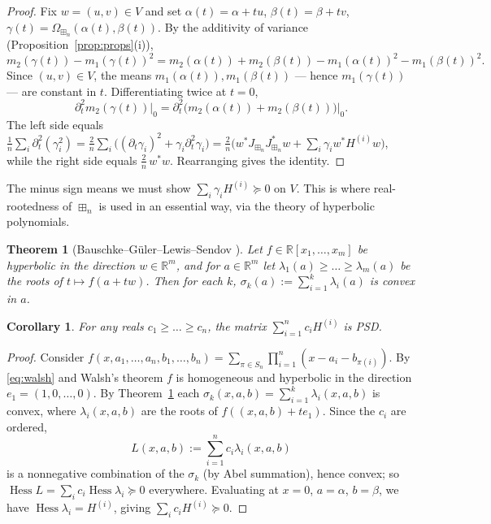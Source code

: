 \documentclass[11pt]{article}
\newcommand{\R}{\mathbb{R}}
\newcommand{\bn}{\boxplus_n}
\newcommand{\Hess}{\operatorname{Hess}}
\newcommand{\PSD}{\succeq 0}
\newtheorem{theorem}{Theorem}
\newtheorem{corollary}{Corollary}
\theoremstyle{definition}
\begin{document}
\begin{proof}
Fix $w=(u,v)\in V$ and set $\alpha(t)=\alpha+tu$, $\beta(t)=\beta+tv$,
$\gamma(t)=\Omega_{\bn}(\alpha(t),\beta(t))$. By the additivity of variance
(Proposition~\ref{prop:props}(i)),
\[
m_2(\gamma(t))-m_1(\gamma(t))^2
=m_2(\alpha(t))+m_2(\beta(t))-m_1(\alpha(t))^2-m_1(\beta(t))^2 .
\]
Since $(u,v)\in V$, the means $m_1(\alpha(t)),m_1(\beta(t))$ — hence
$m_1(\gamma(t))$ — are constant in $t$. Differentiating twice at $t=0$,
\[
\partial_t^2 m_2(\gamma(t))\big|_0=\partial_t^2\bigl(m_2(\alpha(t))+m_2(\beta(t))\bigr)\big|_0 .
\]
The left side equals
$\tfrac1n\sum_i\partial_t^2(\gamma_i^2)
=\tfrac2n\sum_i\bigl((\partial_t\gamma_i)^2+\gamma_i\partial_t^2\gamma_i\bigr)
=\tfrac2n\bigl(w^\ast J_{\bn}J_{\bn}^\ast w+\sum_i\gamma_i w^\ast H^{(i)}w\bigr)$,
while the right side equals $\tfrac2n\,w^\ast w$. Rearranging gives the
identity.
\end{proof}

The minus sign means we must show $\sum_i\gamma_i H^{(i)}\PSD$ on $V$. This is
where real-rootedness of $\bn$ is used in an essential way, via the theory of
hyperbolic polynomials.

\begin{theorem}[Bauschke--G\"uler--Lewis--Sendov \cite{BGLS}]\label{thm:bgls}
Let $f\in\R[x_1,\dots,x_m]$ be hyperbolic in the direction $w\in\R^m$, and for
$a\in\R^m$ let $\lambda_1(a)\ge\dots\ge\lambda_m(a)$ be the roots of
$t\mapsto f(a+tw)$. Then for each $k$, $\sigma_k(a):=\sum_{i=1}^k\lambda_i(a)$ is
convex in $a$.
\end{theorem}

\begin{corollary}\label{cor:psd}
For any reals $c_1\ge\dots\ge c_n$, the matrix $\sum_{i=1}^n c_i H^{(i)}$ is PSD.
\end{corollary}

\begin{proof}
Consider $f(x,a_1,\dots,a_n,b_1,\dots,b_n)=\sum_{\pi\in S_n}\prod_{i=1}^n
(x-a_i-b_{\pi(i)})$. By \eqref{eq:walsh} and Walsh's theorem $f$ is homogeneous
and hyperbolic in the direction $e_1=(1,0,\dots,0)$. By Theorem~\ref{thm:bgls}
each $\sigma_k(x,a,b)=\sum_{i=1}^k\lambda_i(x,a,b)$ is convex, where
$\lambda_i(x,a,b)$ are the roots of $f((x,a,b)+te_1)$. Since the $c_i$ are
ordered,
\[
L(x,a,b):=\sum_{i=1}^n c_i\lambda_i(x,a,b)
\]
is a nonnegative combination of the $\sigma_k$ (by Abel summation), hence convex;
so $\Hess L=\sum_i c_i\Hess\lambda_i\PSD$ everywhere. Evaluating at $x=0$,
$a=\alpha$, $b=\beta$, we have $\Hess\lambda_i=H^{(i)}$, giving
$\sum_i c_i H^{(i)}\PSD$.
\end{proof}
\end{document}
